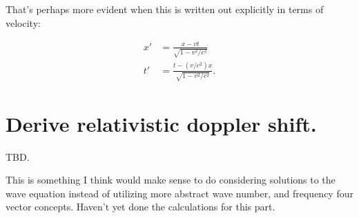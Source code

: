 \documentclass{article}      %
\begin{document}
That's perhaps more evident when this is written out explicitly in terms of velocity:

\begin{align}
x' &= \frac{x - v t}{\sqrt{1 - v^2/c^2}} \\
t' &= \frac{t - (v/c^2) x}{\sqrt{1 - v^2/c^2}}.
\end{align}

\section{ Derive relativistic doppler shift.}

TBD.

This is something I think would make sense to do considering solutions
to the wave
equation instead of utilizing more abstract wave number, and frequency
four vector concepts.  Haven't yet done the calculations for this part.
\end{document}
